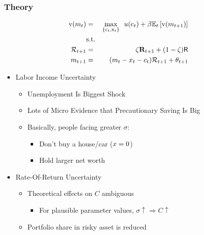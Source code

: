 \documentclass[pdflatex]{beamer}
\begin{document}
\begin{frame}\frametitle{\bf Theory}

  \begin{eqnarray}
    \mathrm{v}(m_{t})&=&\underset{\{\mathrm{c}_{t},\mathrm{x}_{t}\}}{\max } ~~ u(\mathrm{c}_{t})+\beta \mathbb{E}_{t}\left[ \mathrm{v}(m_{t+1}) \notag
                         \right]   \label{eq:hetdecisionprobnashk}\\
    \notag &\text{s.t.}&\\
    \mathcal{R}_{t+1} & = & \zeta \mathbf{R}_{t+1}+(1-\zeta)\mathsf{R} \notag \\
    m_{t+1} & = & (m_{t}-x_{t}-c_{t})\mathcal{R}_{t+1}+\theta_{t+1} \notag
  \end{eqnarray}

  \begin{itemize}
  \item Labor Income Uncertainty
    \begin{itemize}
    \item Unemployment Is Biggest Shock
    \item Lots of Micro Evidence that Precautionary Saving Is Big
    \item Basically, people facing greater $\sigma$:
      \begin{itemize}
      \item Don't buy a house/car  ($x = 0$)
      \item Hold larger net worth
      \end{itemize}
    \end{itemize}
  \item Rate-Of-Return Uncertainty
    \begin{itemize}
    \item Theoretical effects on $C$ ambiguous
      \begin{itemize}
        \item For plausible parameter values, $\sigma \uparrow \Rightarrow C \uparrow$
      \end{itemize}
    \item Portfolio share in risky asset is reduced
    \end{itemize}
  \end{itemize}
\end{frame}
\end{document}
